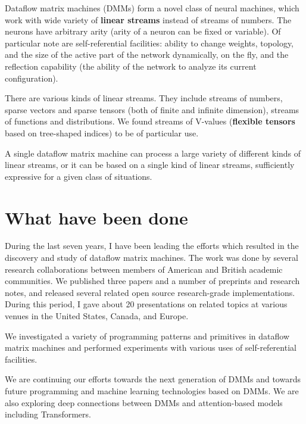 \documentclass{article}
\begin{document}
\vspace{0.1in}
\noindent
Dataflow matrix machines (DMMs) form a novel class of neural machines, which work with wide variety
of {\bf linear streams} instead of streams of numbers. The neurons have
arbitrary arity (arity of a neuron can be fixed or variable). Of particular note are
self-referential facilities: ability to change weights, topology, and the size of the active part of the network dynamically, on the fly,
and the reflection capability (the ability of the network to analyze its current configuration).

\vspace{0.1in}
\noindent
There are various kinds of linear streams. They include streams of numbers, sparse vectors and sparse tensors (both of
finite and infinite dimension), streams of functions and distributions. We found streams of V-values
({\bf flexible tensors} based on tree-shaped indices) to be of particular use.

\vspace{0.1in}
\noindent
A single dataflow matrix machine can process a large variety of different kinds of linear streams, or
it can be based on a single kind of linear streams, sufficiently expressive for a given class of situations.

\section{What have been done}

During the last seven years, I have been leading the efforts which resulted in
the discovery and study of dataflow matrix machines. The work was done by
several research collaborations between members of American and British 
academic communities. We published three papers and a number of preprints and
research notes, and released several related open source research-grade
implementations. During this period, I gave about 20 presentations on 
related topics at various venues in the United States, Canada, and Europe.

\vspace{0.1in}
\noindent
We investigated a variety of programming patterns and primitives in
dataflow matrix machines and performed experiments with various uses of self-referential
facilities.

\vspace{0.1in}
\noindent
We are continuing our efforts towards the next generation of DMMs 
and towards future programming and machine learning
technologies based on DMMs. We are also exploring 
deep connections between DMMs and attention-based models including Transformers.
\end{document}
